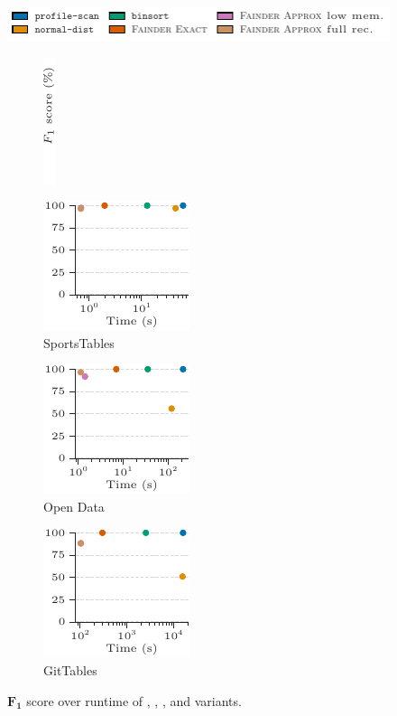 \begin{figure}[t]
    \setlength{\belowcaptionskip}{-2mm}
    \centering
    \includegraphics{figures/figure_18_legend.pdf}\\
    \begin{subfigure}[t]{.03\linewidth}
        \centering
        \includegraphics{figures/figure_18_label.pdf}
    \end{subfigure}%
    \hspace{-0.005\linewidth}%
    \begin{subfigure}[t]{.325\linewidth}
        \centering
        \includegraphics{figures/figure_18_a.pdf}
        \caption{SportsTables}
    \end{subfigure}%
    \begin{subfigure}[t]{.325\linewidth}
        \centering
        \includegraphics{figures/figure_18_b.pdf}
        \caption{Open Data}
    \end{subfigure}%
    \begin{subfigure}[t]{.325\linewidth}
        \centering
        \includegraphics{figures/figure_18_c.pdf}
        \caption{GitTables}
    \end{subfigure}%
    \caption{$\boldsymbol{F_1}$ score over runtime of \pscan, \ndist, \binsort, and \system{} variants.}
    \label{fig:accuracy_scatterplot_f1}
\end{figure}


